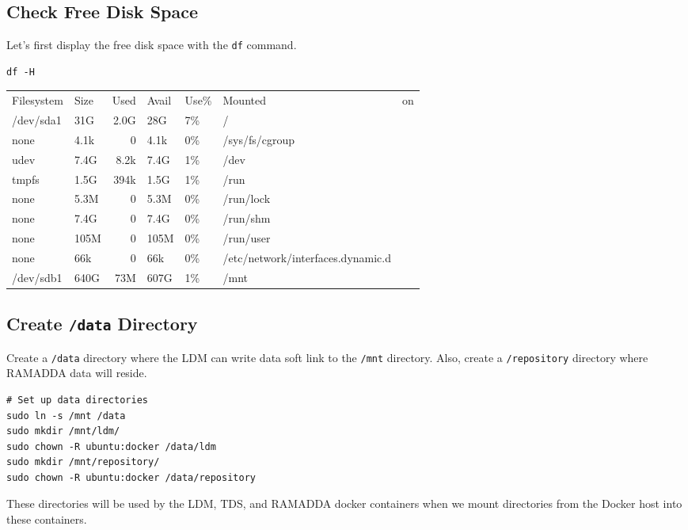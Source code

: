 \documentclass[11pt]{article}
\begin{document}
\subsection{Check Free Disk Space}
\label{sec:orgheadline28}

Let's first display the free disk space with the \texttt{df} command. 
\begin{verbatim}
df -H
\end{verbatim}

\begin{center}
\begin{tabular}{llrllll}
Filesystem & Size & Used & Avail & Use\% & Mounted & on\\
/dev/sda1 & 31G & 2.0G & 28G & 7\% & / & \\
none & 4.1k & 0 & 4.1k & 0\% & /sys/fs/cgroup & \\
udev & 7.4G & 8.2k & 7.4G & 1\% & /dev & \\
tmpfs & 1.5G & 394k & 1.5G & 1\% & /run & \\
none & 5.3M & 0 & 5.3M & 0\% & /run/lock & \\
none & 7.4G & 0 & 7.4G & 0\% & /run/shm & \\
none & 105M & 0 & 105M & 0\% & /run/user & \\
none & 66k & 0 & 66k & 0\% & /etc/network/interfaces.dynamic.d & \\
/dev/sdb1 & 640G & 73M & 607G & 1\% & /mnt & \\
\end{tabular}
\end{center}

\subsection{Create \texttt{/data} Directory}
\label{sec:orgheadline29}

Create a \texttt{/data} directory where the LDM can write data soft link to the \texttt{/mnt} directory. Also, create a \texttt{/repository} directory where RAMADDA data will reside.

\begin{verbatim}
# Set up data directories
sudo ln -s /mnt /data
sudo mkdir /mnt/ldm/
sudo chown -R ubuntu:docker /data/ldm
sudo mkdir /mnt/repository/
sudo chown -R ubuntu:docker /data/repository
\end{verbatim}

These directories will be used by the LDM, TDS, and RAMADDA docker containers when we mount directories from the Docker host into these containers.
\end{document}
